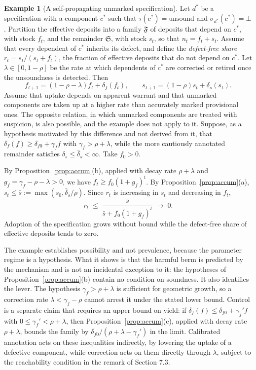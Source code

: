 \documentclass[11pt]{article}
\theoremstyle{definition}
\newtheorem{example}[proposition]{Example}
\theoremstyle{remark}
\begin{document}
\begin{example}[A self-propagating unmarked specification]\label{ex:harm}
Let $d^\ast$ be a specification with a component $c^\ast$ such that $\tau(c^\ast)=\mathrm{unsound}$ and $\sigma_{d^\ast}(c^\ast)=\bot$. Partition the effective deposits into a family $\mathfrak{F}$ of deposits that depend on $c^\ast$, with stock $f_t$, and the remainder $\mathfrak{S}$, with stock $s_t$, so that $n_t=f_t+s_t$. Assume that every dependent of $c^\ast$ inherits its defect, and define the \emph{defect-free share} $r_t=s_t/(s_t+f_t)$, the fraction of effective deposits that do not depend on $c^\ast$. Let $\lambda\in[0,1-\rho]$ be the rate at which dependents of $c^\ast$ are corrected or retired once the unsoundness is detected. Then
$$f_{t+1}=(1-\rho-\lambda)f_t+\delta_f(f_t),\qquad s_{t+1}=(1-\rho)s_t+\delta_s(s_t).$$
Assume that uptake depends on apparent warrant and that unmarked components are taken up at a higher rate than accurately marked provisional ones. The opposite relation, in which unmarked components are treated with suspicion, is also possible, and the example does not apply to it. Suppose, as a hypothesis motivated by this difference and not derived from it, that $\delta_f(f)\ge\delta_{f0}+\gamma_f f$ with $\gamma_f>\rho+\lambda$, while the more cautiously annotated remainder satisfies $\delta_s\le\bar\delta_s<\infty$. Take $f_0>0$.

By Proposition~\ref{prop:accum}(b), applied with decay rate $\rho+\lambda$ and $g_f=\gamma_f-\rho-\lambda>0$, we have $f_t\ge f_0(1+g_f)^t$. By Proposition~\ref{prop:accum}(a), $s_t\le\bar s:=\max(s_0,\bar\delta_s/\rho)$. Since $r_t$ is increasing in $s_t$ and decreasing in $f_t$,
$$r_t\;\le\;\frac{\bar s}{\bar s+f_0(1+g_f)^t}\;\longrightarrow\;0 .$$
Adoption of the specification grows without bound while the defect-free share of effective deposits tends to zero.
\end{example}

The example establishes possibility and not prevalence, because the parameter regime is a hypothesis. What it shows is that the harmful berm is predicted by the mechanism and is not an incidental exception to it: the hypotheses of Proposition~\ref{prop:accum}(b) contain no condition on soundness. It also identifies the lever. The hypothesis $\gamma_f>\rho+\lambda$ is sufficient for geometric growth, so a correction rate $\lambda<\gamma_f-\rho$ cannot arrest it under the stated lower bound. Control is a separate claim that requires an upper bound on yield: if $\delta_f(f)\le\delta_{f0}+\gamma_f' f$ with $0\le\gamma_f'<\rho+\lambda$, then Proposition~\ref{prop:accum}(c), applied with decay rate $\rho+\lambda$, bounds the family by $\delta_{f0}/(\rho+\lambda-\gamma_f')$ in the limit. Calibrated annotation acts on these inequalities indirectly, by lowering the uptake of a defective component, while correction acts on them directly through $\lambda$, subject to the reachability condition in the remark of Section 7.3.
\end{document}
